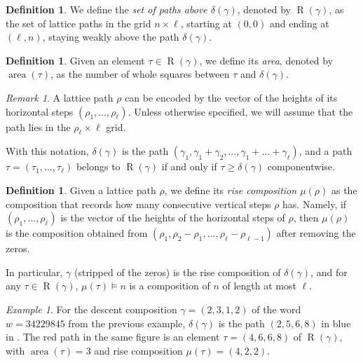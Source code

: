 \documentclass[reqno]{amsart}
\theoremstyle{plain}
\theoremstyle{definition}
\newtheorem{definition}[theorem]{Definition}
\theoremstyle{remark}
\newtheorem{remark}[theorem]{Remark}
\newtheorem{example}[theorem]{Example}
\DeclareMathOperator{\R}{R}
\DeclareMathOperator{\area}{area}
\newcommand{\<}{\langle}
\renewcommand{\>}{\rangle}
\begin{document}
\begin{definition}
    We define the \emph{set of paths above $\delta\left(\gamma\right)$}, denoted by $\R(\gamma)$, as the set of lattice paths in the grid $n\times\ell$, starting at $(0,0)$ and ending at $(\ell,n)$, staying weakly above the path $\delta(\gamma)$.
\end{definition}

\begin{definition}
    Given an element $\tau\in \R(\gamma)$, we define its \emph{area}, denoted by $\area(\tau)$, as the number of whole squares between $\tau$ and $\delta(\gamma)$.
\end{definition}

\begin{remark}
    \label{rmk:heights}
    A lattice path $\rho$ can be encoded by the vector of the heights of its horizontal steps $(\rho_1,\dots,\rho_\ell)$. Unless otherwise specified, we will assume that the path lies in the $\rho_\ell\times\ell$ grid.

    With this notation, $\delta(\gamma)$ is the path $(\gamma_1,\gamma_1+\gamma_2,\dots,\gamma_1+\dots+\gamma_\ell)$, and a path $\tau=(\tau_1,\dots,\tau_\ell)$ belongs to $\R(\gamma)$ if and only if $\tau \geq \delta(\gamma)$ componentwise.
\end{remark}

\begin{definition}
    Given a lattice path $\rho$, we define its \emph{rise composition $\mu(\rho)$} as the composition that records how many consecutive vertical steps $\rho$ has. Namely, if $(\rho_1,\dots,\rho_\ell)$ is the vector of the heights of the horizontal steps of $\rho$, then $\mu(\rho)$ is the composition obtained from $(\rho_1,\rho_2-\rho_1,\dots,\rho_\ell-\rho_{\ell-1})$ after removing the zeros.
\end{definition}

In particular, $\gamma$ (stripped of the zeros) is the rise composition of $\delta(\gamma)$, and for any $\tau \in \R(\gamma)$, $\mu(\tau) \vDash n$ is a composition of $n$ of length at most $\ell$.

\begin{example}
    For the descent composition $\gamma=(2,3,1,2)$ of the word $w=34229845$ from the previous example, $\delta(\gamma)$ is the path $(2,5,6,8)$ in blue in . The red path in the same figure is an element $\tau=(4,6,6,8)$ of $\R(\gamma)$, with $\area(\tau)=3$ and rise composition $\mu(\tau)=(4,2,2)$.
\end{example}
\end{document}
